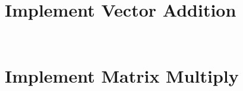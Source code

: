\documentclass[11pt,letter]{article}
\begin{document}
\section{Implement Vector Addition}

\begin{lstlisting}[label=some-code,caption=vvadd.cl]

\end{lstlisting}

\begin{lstlisting}[label=some-code,caption=vvadd.cpp]

\end{lstlisting}

\section{Implement Matrix Multiply}

\begin{lstlisting}[label=some-code,caption=matmul.cl]

\end{lstlisting}


\begin{lstlisting}[label=some-code,caption=matmul.cpp]

\end{lstlisting}

\end{document}
